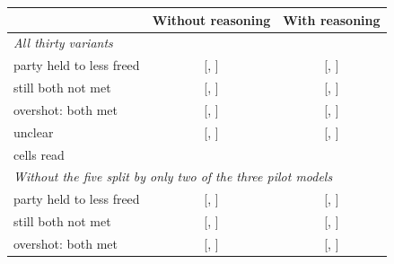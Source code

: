 \begin{table}[t]
\centering
\footnotesize
\begin{tabular}{lcc}
\toprule
 & Without reasoning & With reasoning \\
\midrule
\multicolumn{3}{l}{\textit{All thirty variants}} \\
party held to less freed & \MilderPartySensitiveNoReasoning{} [\MilderPartySensitiveNoReasoningLo{}, \MilderPartySensitiveNoReasoningHi{}] & \MilderPartySensitiveReasoning{} [\MilderPartySensitiveReasoningLo{}, \MilderPartySensitiveReasoningHi{}] \\
still both not met & \MilderStillBothNotMetNoReasoning{} [\MilderStillBothNotMetNoReasoningLo{}, \MilderStillBothNotMetNoReasoningHi{}] & \MilderStillBothNotMetReasoning{} [\MilderStillBothNotMetReasoningLo{}, \MilderStillBothNotMetReasoningHi{}] \\
overshot: both met & \MilderOvershotNoReasoning{} [\MilderOvershotNoReasoningLo{}, \MilderOvershotNoReasoningHi{}] & \MilderOvershotReasoning{} [\MilderOvershotReasoningLo{}, \MilderOvershotReasoningHi{}] \\
unclear & \MilderUnclearNoReasoning{} [\MilderUnclearNoReasoningLo{}, \MilderUnclearNoReasoningHi{}] & \MilderUnclearReasoning{} [\MilderUnclearReasoningLo{}, \MilderUnclearReasoningHi{}] \\
cells read & \MilderCellsReadNoReasoning{} & \MilderCellsReadReasoning{} \\
\multicolumn{3}{l}{\textit{Without the five split by only two of the three pilot models}} \\
party held to less freed & \MilderPartySensitiveNoReasoningWithoutTwoOfThree{} [\MilderPartySensitiveNoReasoningWithoutTwoOfThreeLo{}, \MilderPartySensitiveNoReasoningWithoutTwoOfThreeHi{}] & \MilderPartySensitiveReasoningWithoutTwoOfThree{} [\MilderPartySensitiveReasoningWithoutTwoOfThreeLo{}, \MilderPartySensitiveReasoningWithoutTwoOfThreeHi{}] \\
still both not met & \MilderStillBothNotMetNoReasoningWithoutTwoOfThree{} [\MilderStillBothNotMetNoReasoningWithoutTwoOfThreeLo{}, \MilderStillBothNotMetNoReasoningWithoutTwoOfThreeHi{}] & \MilderStillBothNotMetReasoningWithoutTwoOfThree{} [\MilderStillBothNotMetReasoningWithoutTwoOfThreeLo{}, \MilderStillBothNotMetReasoningWithoutTwoOfThreeHi{}] \\
overshot: both met & \MilderOvershotNoReasoningWithoutTwoOfThree{} [\MilderOvershotNoReasoningWithoutTwoOfThreeLo{}, \MilderOvershotNoReasoningWithoutTwoOfThreeHi{}] & \MilderOvershotReasoningWithoutTwoOfThree{} [\MilderOvershotReasoningWithoutTwoOfThreeLo{}, \MilderOvershotReasoningWithoutTwoOfThreeHi{}] \\

\end{tabular}
\end{table}

